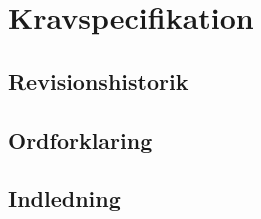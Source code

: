 \chapter{Kravspecifikation}

\section{Revisionshistorik}

\section{Ordforklaring}

\newpage
\section{Indledning}
